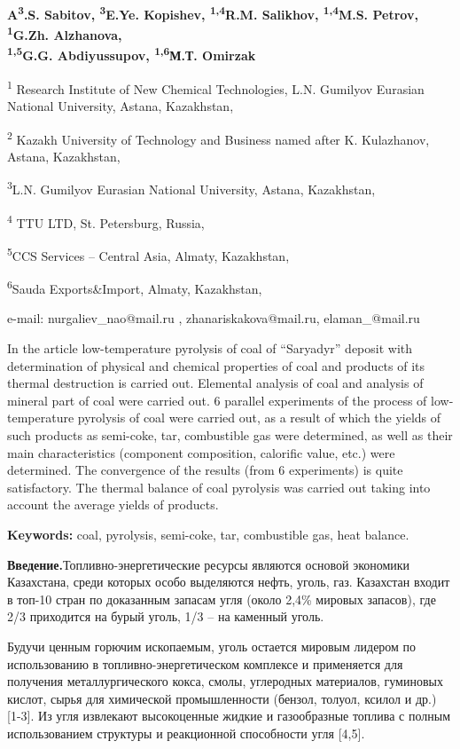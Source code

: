 {\bfseries A\textsuperscript{3}.S. Sabitov, \textsuperscript{3}E.Ye.
Kopishev, \textsuperscript{1,4}R.M. Salikhov, \textsuperscript{1,4}M.S.
Petrov, \textsuperscript{1}G.Zh. Alzhanova,\\
\textsuperscript{1,5}G.G. Abdiyussupov, \textsuperscript{1,6}М.Т.
Omirzak}

\textsuperscript{1} Research Institute of New Chemical Technologies,
L.N. Gumilyov Eurasian National University, Astana, Kazakhstan,

\textsuperscript{2} Kazakh University of Technology and Business named
after K. Kulazhanov, Astana, Kazakhstan,

\textsuperscript{3}L.N. Gumilyov Eurasian National University, Astana,
Kazakhstan,

\textsuperscript{4} TTU LTD, St. Petersburg, Russia,

\textsuperscript{5}CCS Services -- Central Asia, Almaty, Kazakhstan,

\textsuperscript{6}Sauda Exports\&Import, Almaty, Kazakhstan,

e-mail: nurgaliev\_nao@mail.ru , zhanariskakova@mail.ru,
elaman\_@mail.ru

In the article low-temperature pyrolysis of coal of ``Saryadyr'' deposit
with determination of physical and chemical properties of coal and
products of its thermal destruction is carried out. Elemental analysis
of coal and analysis of mineral part of coal were carried out. 6
parallel experiments of the process of low-temperature pyrolysis of coal
were carried out, as a result of which the yields of such products as
semi-coke, tar, combustible gas were determined, as well as their main
characteristics (component composition, calorific value, etc.) were
determined. The convergence of the results (from 6 experiments) is quite
satisfactory. The thermal balance of coal pyrolysis was carried out
taking into account the average yields of products.

{\bfseries Keywords:} coal, pyrolysis, semi-coke, tar, combustible gas,
heat balance.

{\bfseries Введение.}Топливно-энергетические ресурсы являются основой
экономики Казахстана, среди которых особо выделяются нефть, уголь, газ.
Казахстан входит в топ-10 стран по доказанным запасам угля (около 2,4\%
мировых запасов), где 2/3 приходится на бурый уголь, 1/3 -- на каменный
уголь.

Будучи ценным горючим ископаемым, уголь остается мировым лидером по
использованию в топливно-энергетическом комплексе и применяется для
получения металлургического кокса, смолы, углеродных материалов,
гуминовых кислот, сырья для химической промышленности (бензол, толуол,
ксилол и др.) {[}1-3{]}. Из угля извлекают высокоценные жидкие и
газообразные топлива с полным использованием структуры и реакционной
способности угля {[}4,5{]}.~

